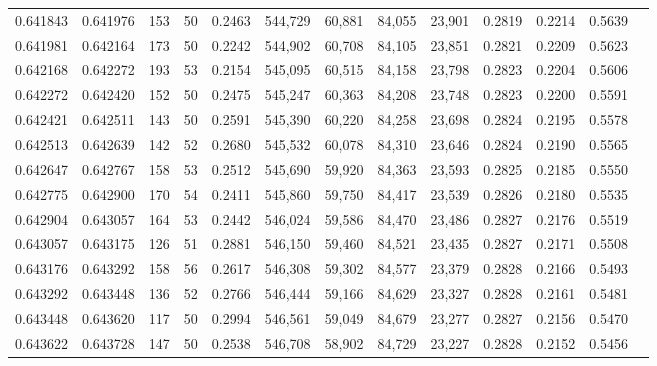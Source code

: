 \begin{tabular}{rrrrrrrrrrrrr}
0.641843 & 0.641976 &   153 &  50 &                                     0.2463 & 544,729 &  60,881 &  84,055 &  23,901 & 0.2819 & 0.2214 & 0.5639 \\
0.641981 & 0.642164 &   173 &  50 &                                     0.2242 & 544,902 &  60,708 &  84,105 &  23,851 & 0.2821 & 0.2209 & 0.5623 \\
0.642168 & 0.642272 &   193 &  53 &                                     0.2154 & 545,095 &  60,515 &  84,158 &  23,798 & 0.2823 & 0.2204 & 0.5606 \\
0.642272 & 0.642420 &   152 &  50 &                                     0.2475 & 545,247 &  60,363 &  84,208 &  23,748 & 0.2823 & 0.2200 & 0.5591 \\
0.642421 & 0.642511 &   143 &  50 &                                     0.2591 & 545,390 &  60,220 &  84,258 &  23,698 & 0.2824 & 0.2195 & 0.5578 \\
0.642513 & 0.642639 &   142 &  52 &                                     0.2680 & 545,532 &  60,078 &  84,310 &  23,646 & 0.2824 & 0.2190 & 0.5565 \\
0.642647 & 0.642767 &   158 &  53 &                                     0.2512 & 545,690 &  59,920 &  84,363 &  23,593 & 0.2825 & 0.2185 & 0.5550 \\
0.642775 & 0.642900 &   170 &  54 &                                     0.2411 & 545,860 &  59,750 &  84,417 &  23,539 & 0.2826 & 0.2180 & 0.5535 \\
0.642904 & 0.643057 &   164 &  53 &                                     0.2442 & 546,024 &  59,586 &  84,470 &  23,486 & 0.2827 & 0.2176 & 0.5519 \\
0.643057 & 0.643175 &   126 &  51 &                                     0.2881 & 546,150 &  59,460 &  84,521 &  23,435 & 0.2827 & 0.2171 & 0.5508 \\
0.643176 & 0.643292 &   158 &  56 &                                     0.2617 & 546,308 &  59,302 &  84,577 &  23,379 & 0.2828 & 0.2166 & 0.5493 \\
0.643292 & 0.643448 &   136 &  52 &                                     0.2766 & 546,444 &  59,166 &  84,629 &  23,327 & 0.2828 & 0.2161 & 0.5481 \\
0.643448 & 0.643620 &   117 &  50 &                                     0.2994 & 546,561 &  59,049 &  84,679 &  23,277 & 0.2827 & 0.2156 & 0.5470 \\
0.643622 & 0.643728 &   147 &  50 &                                     0.2538 & 546,708 &  58,902 &  84,729 &  23,227 & 0.2828 & 0.2152 & 0.5456 \\

\end{tabular}
